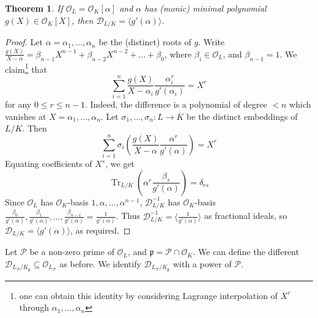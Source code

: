 \documentclass[11pt]{article}
\theoremstyle{definition}
\theoremstyle{plain}
\newtheorem{theorem}[definition]{Theorem}
\theoremstyle{remark}
\DeclareMathOperator{\Tr}{Tr}
\newcommand{\cD}{\mathcal{D}}
\newcommand{\cO}{\mathcal{O}}
\newcommand{\cP}{\mathcal{P}}
\newcommand{\fp}{\mathfrak{p}}
\begin{document}
\begin{theorem}\label{thm:12_8}
    If $\cO_L = \cO_K[\alpha]$ and $\alpha$ has (monic) minimal polynomial $g(X) \in \cO_K[X]$, then $\cD_{L/K} = \langle g'(\alpha) \rangle$.
\end{theorem}
\begin{proof}
    Let $\alpha = \alpha_1, \ldots, \alpha_n$ be the (distinct) roots of $g$. Write $\frac{g(X)}{X-\alpha} = \beta_{n-1}X^{n-1} + \beta_{n-2} X^{n-2} + \ldots + \beta_0$, where $\beta_i \in \cO_L$, and $\beta_{n-1} = 1$. We claim\footnote{one can obtain this identity by considering Lagrange interpolation of $X^r$ through $\alpha_1, \ldots, \alpha_n$} that
    \begin{equation*}
        \sum_{i=1}^n \frac{g(X)}{X - \alpha_i} \frac{\alpha_i^r}{g'(\alpha_i)} = X^r
    \end{equation*}
    for any $0 \le r \le n-1$. Indeed, the difference is a polynomial of degree $< n$ which vanishes at $X = \alpha_1, \ldots, \alpha_n$. Let $\sigma_1, \ldots, \sigma_n : L \to \overline{K}$ be the distinct embeddings of $L/K$. Then
    \begin{equation*}
        \sum_{i=1}^n \sigma_i\left(\frac{g(X)}{X - \alpha} \frac{\alpha^r}{g'(\alpha)}\right) = X^r
    \end{equation*}
    Equating coefficients of $X^s$, we get
    \begin{equation*}
        \Tr_{L/K}\left(\alpha^r \frac{\beta_s}{g'(\alpha)}\right) = \delta_{rs}
    \end{equation*}
    Since $\cO_L$ has $\cO_K$-basis $1, \alpha, \ldots, \alpha^{n-1}$, $\cD_{L/K}^{-1}$ has $\cO_K$-basis $\frac{\beta_0}{g'(\alpha)}, \frac{\beta_1}{g'(\alpha)}, \ldots, \frac{\beta_{n-1}}{g'(\alpha)} = \frac{1}{g'(\alpha)}$. Thus $\cD_{L/K}^{-1} = \langle \frac{1}{g'(\alpha)} \rangle$ as fractional ideals, so $\cD_{L/K} = \langle g'(\alpha) \rangle$, as required.
\end{proof}

Let $\cP$ be a non-zero prime of $\cO_L$, and $\fp = \cP \cap \cO_K$. We can define the different $\cD_{L_\cP / K_\fp} \subseteq \cO_{L_\cP}$ as before. We identify $\cD_{L_\cP / K_\fp}$ with a power of $\cP$.
\end{document}

